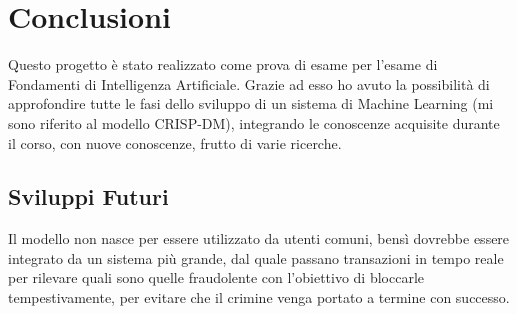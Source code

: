 \documentclass[]{article}
\begin{document}
\section{Conclusioni}
    Questo progetto è stato realizzato come prova di esame per l'esame di Fondamenti di Intelligenza Artificiale. Grazie ad esso ho avuto la possibilità di approfondire tutte le fasi dello sviluppo di un sistema di Machine Learning (mi sono riferito al modello CRISP-DM), integrando le conoscenze acquisite durante il corso, con nuove conoscenze, frutto di varie ricerche.\\
    \subsection{Sviluppi Futuri}
        Il modello non nasce per essere utilizzato da utenti comuni, bensì dovrebbe essere integrato da un sistema più grande, dal quale passano transazioni in tempo reale per rilevare quali sono quelle fraudolente con l'obiettivo di bloccarle tempestivamente, per evitare che il crimine venga portato a termine con successo.\\
\end{document}
